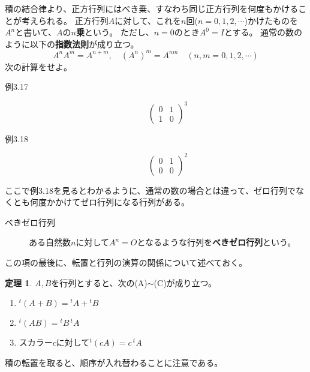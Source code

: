 \documentclass[10pt]{jsreport}
\theoremstyle{definition}%
\newtheorem{thm}{定理}[section]%
\newcommand{\kakko}[1]{\left(#1 \right)} %
\numberwithin{equation}{section}%
\begin{document}
積の結合律より、正方行列にはべき乗、すなわち同じ正方行列を何度もかけることが考えられる。
正方行列$A$に対して、これを$n$回($n=0,1,2,\cdots$)かけたものを$A^{n}$と書いて、$A$の{\bf $n$乗}という。
ただし、$n=0$のとき$A^{0}=I$とする。
通常の数のように以下の{\bf 指数法則}が成り立つ。
\begin{equation}
  A^{n}A^{m}=A^{n+m},\quad (A^{n})^{m}=A^{nm} \quad(n,m=0,1,2,\cdots )
\end{equation}
次の計算をせよ。
\begin{description}
  \item[例3.17] 
  \begin{equation}
  \kakko{\begin{matrix}
    0&1\\
    1&0
  \end{matrix} }^{3}
  \end{equation}
  \item[例3.18]   \begin{equation}\kakko{\begin{matrix}
    0&1\\
    0&0
  \end{matrix}}^{2}
\end{equation}
\end{description}
ここで例3.18を見るとわかるように、通常の数の場合とは違って、ゼロ行列でなくとも何度かかけてゼロ行列になる行列がある。
\begin{framed}
  \begin{description}
    \item[べきゼロ行列] ある自然数$n$に対して$A^{n}=O$となるような行列を{\bf べきゼロ行列}という。
  \end{description}
  \end{framed}
この項の最後に、転置と行列の演算の関係について述べておく。
\begin{screen}
  \begin{thm}
    $A,B$を行列とすると、次の(A)$\sim$(C)が成り立つ。
    \begin{enumerate}
      \item ${}^{t}(A+B)={}^{t}A+{}^{t}B$ 
      \item ${}^{t}(AB)={}^{t}B\,{}^{t}A$
      \item スカラー$c$に対して${}^{t}(cA)=c\,{}^{t}A$
    \end{enumerate}
  \end{thm}
\end{screen}
積の転置を取ると、順序が入れ替わることに注意である。
\end{document}
